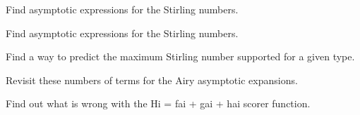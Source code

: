 \begin{DoxyRefList}
\item[\label{todo__todo000012}%
\Hypertarget{todo__todo000012}%
Member \hyperlink{namespacestd_1_1____detail_a4589d459a7a9d1d9e19b33601238a4af}{std\+:\+:\+\_\+\+\_\+detail\+:\+:\+\_\+\+\_\+stirling\+\_\+2} (unsigned int \+\_\+\+\_\+n, unsigned int \+\_\+\+\_\+m)]Find asymptotic expressions for the Stirling numbers.  
\item[\label{todo__todo000013}%
\Hypertarget{todo__todo000013}%
Member \hyperlink{namespacestd_1_1____detail_a286c6f5a5de7aa8493aa5a8bf491b26e}{std\+:\+:\+\_\+\+\_\+detail\+:\+:\+\_\+\+\_\+stirling\+\_\+2} (unsigned int \+\_\+\+\_\+n)]Find asymptotic expressions for the Stirling numbers.  
\item[\label{todo__todo000011}%
\Hypertarget{todo__todo000011}%
Member \hyperlink{namespacestd_1_1____detail_a8408f17699eb43a14447c7e4795b277f}{std\+:\+:\+\_\+\+\_\+detail\+:\+:\+\_\+\+\_\+stirling\+\_\+2\+\_\+series} (unsigned int \+\_\+\+\_\+n, unsigned int \+\_\+\+\_\+m)]Find a way to predict the maximum Stirling number supported for a given type.  
\item[\label{todo__todo000003}%
\Hypertarget{todo__todo000003}%
Member \hyperlink{classstd_1_1____detail_1_1__Airy__asymp_a64bce3ed154b3268944ae20f324d64cd}{std\+:\+:\+\_\+\+\_\+detail\+:\+:\+\_\+\+Airy\+\_\+asymp$<$ \+\_\+\+Tp $>$\+:\+:\+\_\+\+S\+\_\+absarg\+\_\+lt\+\_\+pio3} (\+\_\+\+Cmplx \+\_\+\+\_\+z) const]Revisit these numbers of terms for the Airy asymptotic expansions.  
\item[\label{todo__todo000002}%
\Hypertarget{todo__todo000002}%
Member \hyperlink{classstd_1_1____detail_1_1__Airy__series_a71f68d64f0e202c4f98146f90c6b3298}{std\+:\+:\+\_\+\+\_\+detail\+:\+:\+\_\+\+Airy\+\_\+series$<$ \+\_\+\+Tp $>$\+:\+:\+\_\+\+S\+\_\+\+Scorer} (\+\_\+\+Cmplx \+\_\+\+\_\+t)]Find out what is wrong with the Hi = fai + gai + hai scorer function.
\end{DoxyRefList}